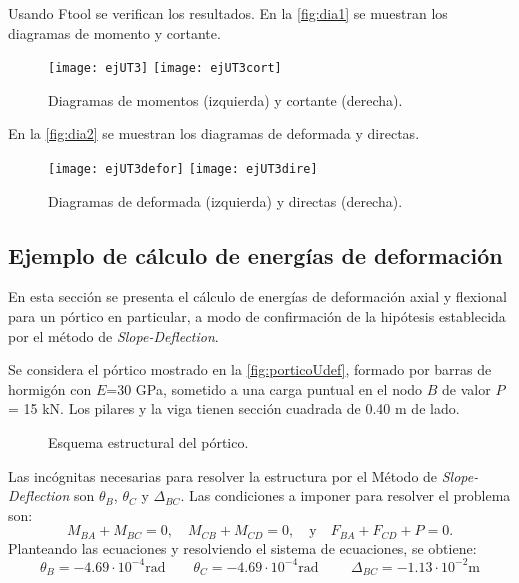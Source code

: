 Usando Ftool se verifican los resultados. En la \autoref{fig:dia1} se muestran los diagramas de momento y cortante.
\begin{figure}[htb]
	\centering
	\texttt{[image: ejUT3]}
	\texttt{[image: ejUT3cort]}
	\caption{Diagramas de momentos (izquierda) y cortante (derecha).}
	\label{fig:dia1}
\end{figure}

En la \autoref{fig:dia2} se muestran los diagramas de deformada y directas.
\begin{figure}[htb]
	\centering
	\texttt{[image: ejUT3defor]}
	\texttt{[image: ejUT3dire]}
	\caption{Diagramas de deformada (izquierda) y directas (derecha).}
	\label{fig:dia2}
\end{figure}


\clearpage

\subsection{Ejemplo de cálculo de energías de deformación} \label{sec:ejenergdef}

En esta sección se presenta el cálculo de energías de deformación axial y flexional para un pórtico en particular, a modo de confirmación de la hipótesis establecida por el método de \textit{Slope-Deflection}.

Se considera el pórtico mostrado en la \autoref{fig:porticoUdef}, formado por barras de hormigón con $E$=30 GPa, sometido a una carga puntual en el nodo $B$ de valor $P$= 15 kN. Los pilares y la viga tienen sección cuadrada de 0.40 m de lado.

\begin{figure}[htb]
	\centering
	\def\svgwidth{0.6\textwidth}
	
	\caption{Esquema estructural del pórtico.}
	\label{fig:porticoUdef}
\end{figure}

Las incógnitas necesarias para resolver la estructura por el Método de \textit{Slope-Deflection} son $\theta_B$,  $\theta_C$ y $\Delta_{BC}$. Las condiciones a imponer para resolver el problema son:
%
\begin{equation}
M_{BA}+M_{BC} = 0, \quad  M_{CB}+M_{CD} = 0, \quad \text{y} \quad 		F_{BA}+F_{CD} + P = 0.
\end{equation}
%
Planteando las ecuaciones y resolviendo el sistema de ecuaciones, se obtiene:
%
\begin{equation}
	\boxed{
	\theta_B = -4.69\cdot 10^{-4} \text{rad} \qquad \theta_C = -4.69\cdot 10^{-4} \text{rad }\qquad \Delta_{BC} = -1.13\cdot 10^{-2} \text{m}}
\end{equation}

